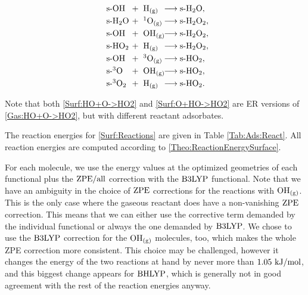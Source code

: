 \documentclass[8.5pt,twoside,twocolumn]{article}
\newcommand\zpe{\enmat{\te{ZPE}}}
\newcommand\zpeall{\enmat{\zpe/\te{all}}}
\newcommand\sur{\enmat{\te{s-}}}
\newcommand\gas{\enmat{_\te{(g)}}}
\newcommand\singo{\enmat{{^1\te{O}}}}
\newcommand\tripo{\enmat{{^3\te{O}}}}
\newcommand\tripot{\enmat{{^3\ot}}}
\newcommand\kmo{\enmat{\te {kJ/mol}}}
\theoremstyle{standard}
\begin{document}
\renewcommand\ronebox[1]{\makebox[1cm][l]{\enmat{#1}}}
\renewcommand\rtwobox[1]{\makebox[1.cm][l]{\ \enmat{#1}}}
\renewcommand\prodbox[1]{\makebox[1.65cm][l]{\enmat{#1}}}
\begin{subequations}
\begin{align}
   \label{Surf:HO+H->H2O}
   \ronebox{\sur\ho}+\rtwobox{\te{H}\gas}\prodbox{\chemar\sur\hto,} \\ 
   \label{Surf:H2O+O->H2O2}
   \ronebox{\sur\hto}+\rtwobox{\singo\gas}\prodbox{\chemar\sur\htot,} \\
   \label{Surf:HO+HO->H2O2}
   \ronebox{\sur\ho}+\rtwobox{\ho\gas}\prodbox{\chemar\sur\htot,} \\
   \label{Surf:HO2+H->H2O2}
   \ronebox{\sur\hot}+\rtwobox{\te{H}\gas}\prodbox{\chemar\sur\htot,} \\
   \label{Surf:HO+O->HO2}
   \ronebox{\sur\ho}+\rtwobox{\tripo\gas}\prodbox{\chemar\sur\hot,} \\
   \label{Surf:O+HO->HO2}
   \ronebox{\sur\tripo}+\rtwobox{\ho\gas}\prodbox{\chemar\sur\hot,} \\
   \label{Surf:3O2+H->HO2}
   \ronebox{\sur\tripot}+\rtwobox{\te{H}\gas}\prodbox{\chemar\sur\hot.}
\end{align}
\label{Surf:Reactions}
\end{subequations}

Note that both \eqref{Surf:HO+O->HO2} and \eqref{Surf:O+HO->HO2} are ER
versions of \eqref{Gas:HO+O->HO2}, but with different reactant adsorbates.

The reaction energies for \eqref{Surf:Reactions} are given in Table \ref{Tab:Ads:React}.
All reaction energies are computed according to \eqref{Theo:ReactionEnergySurface}.

For each molecule, we use the energy values at the optimized
geometries of each functional plus the $\zpeall$ correction with the $\text{B3LYP}$ functional. Note that we have an ambiguity in the choice
of $\zpe$ corrections for the reactions with $\ho\gas$. This is the only
case where the gaseous reactant does have a non-vanishing $\zpe$ correction.
This means that we can either use the corrective term demanded by the
individual functional or always the one demanded by $\text{B3LYP}$. We chose to use
the $\text{B3LYP}$ correction for the $\ho\gas$ molecules, too, which makes the whole
ZPE correction more consistent. This choice may be challenged, however it 
changes the energy of the two reactions at hand by never more than $1.05~\kmo$,
and this biggest change appears for $\text{BHLYP}$, which is generally not in good
agreement with the rest of the reaction energies anyway.
\end{document}
